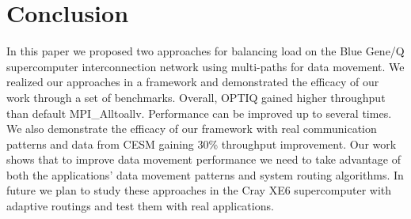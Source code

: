 \section{Conclusion}
\label{sec:conclusion}

In this paper we proposed two approaches for balancing load on the Blue Gene/Q supercomputer interconnection network using multi-paths for data movement. We realized our approaches in a framework and demonstrated the efficacy of our work through a set of benchmarks. Overall, OPTIQ gained higher throughput than default MPI\_Alltoallv. Performance can be improved up to several times. We also demonstrate the efficacy of our framework with real communication patterns and data from CESM gaining 30\% throughput improvement. Our work shows that to improve data movement performance we need to take advantage of both the applications' data movement patterns and system routing algorithms. In future we plan to study these approaches in the Cray XE6 supercomputer with adaptive routings and test them with real applications.
